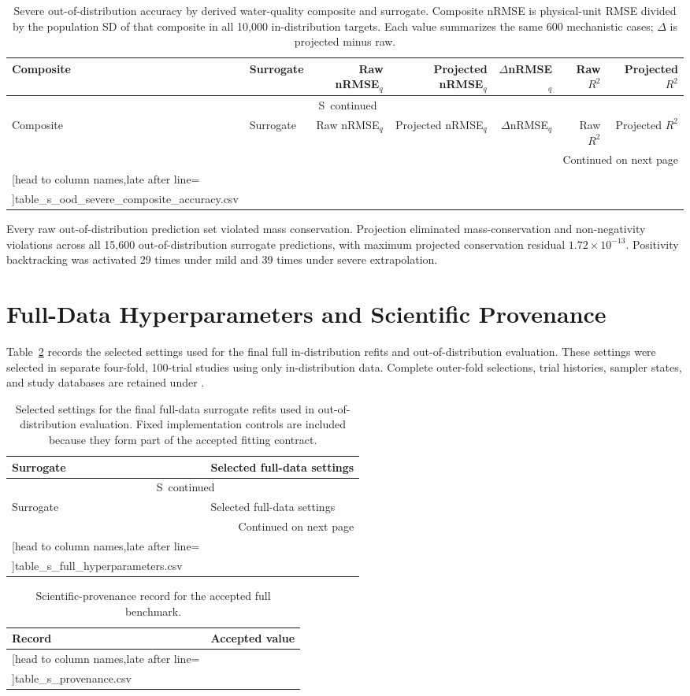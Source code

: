 \documentclass[a4paper,10pt]{article}
\newcommand{\csvrowstwo}[1]{%
  \csvreader[head to column names,late after line=\\]{#1}{}{\colA & \colB}}
\newcommand{\csvrowsseven}[1]{%
  \csvreader[head to column names,late after line=\\]{#1}{}{\colA & \colB & \colC & \colD & \colE & \colF & \colG}}
\newcommand{\csvlongtable}[7]{%
  \begin{longtable}{#1}
  \caption{#2}\label{#3}\\
  \toprule
  #5 \\
  \midrule
  \endfirsthead
  \multicolumn{#4}{c}{\tablename\ \thetable\ continued}\\
  \toprule
  #5 \\
  \midrule
  \endhead
  \midrule\multicolumn{#4}{r}{Continued on next page}\\
  \endfoot
  \bottomrule
  \endlastfoot
  #7{#6}
  \end{longtable}%
}
\renewcommand{\thetable}{S\arabic{table}}
\begin{document}
\clearpage
\begingroup
\scriptsize
\setlength{\tabcolsep}{3pt}
\csvlongtable
  {lp{3.1cm}rrrrr}
  {Severe out-of-distribution accuracy by derived water-quality composite and surrogate. Composite nRMSE is physical-unit RMSE divided by the population SD of that composite in all 10,000 in-distribution targets. Each value summarizes the same 600 mechanistic cases; $\Delta$ is projected minus raw.}
  {tab:s_ood_severe_composite_accuracy}
  {7}
  {Composite & Surrogate & Raw nRMSE$_q$ & Projected nRMSE$_q$ & $\Delta$nRMSE$_q$ & Raw $R^2$ & Projected $R^2$}
  {table_s_ood_severe_composite_accuracy.csv}
  {\csvrowsseven}
\endgroup

Every raw out-of-distribution prediction set violated mass conservation. Projection eliminated mass-conservation and non-negativity violations across all 15,600 out-of-distribution surrogate predictions, with maximum projected conservation residual $1.72\times10^{-13}$. Positivity backtracking was activated 29 times under mild and 39 times under severe extrapolation.

\section{Full-Data Hyperparameters and Scientific Provenance}

Table~\ref{tab:s_full_hyperparameters} records the selected settings used for the final full in-distribution refits and out-of-distribution evaluation. These settings were selected in separate four-fold, 100-trial studies using only in-distribution data. Complete outer-fold selections, trial histories, sampler states, and study databases are retained under .

\begingroup
\scriptsize
\setlength{\tabcolsep}{4pt}
\csvlongtable
  {p{3.2cm}p{11.5cm}}
  {Selected settings for the final full-data surrogate refits used in out-of-distribution evaluation. Fixed implementation controls are included because they form part of the accepted fitting contract.}
  {tab:s_full_hyperparameters}
  {2}
  {Surrogate & Selected full-data settings}
  {table_s_full_hyperparameters.csv}
  {\csvrowstwo}
\endgroup

\begin{table}[htbp]
\centering
\caption{Scientific-provenance record for the accepted full benchmark.}
\label{tab:s_provenance}
\small
\begin{tabular}{p{4.1cm}p{10.3cm}}
\toprule
Record & Accepted value \\
\midrule
\csvrowstwo{table_s_provenance.csv}
\bottomrule
\end{tabular}
\end{table}
\end{document}
